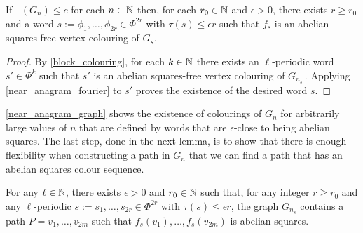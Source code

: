 \documentclass{patmorin}
\DeclareMathOperator{\afcn}{\dot{\chi}_\pi}
\begin{document}
\begin{lem}\label{near_anagram_graph}
    If $\afcn(G_n)\le c$ for each $n\in\mathbb{N}$ then, for each $r_0\in\mathbb{N}$ and $\epsilon>0$, there exists $r\ge r_0$ and a word $s:=\phi_1,\ldots,\phi_{2r}\in\Phi^{2r}$ with $\tau(s)\le\epsilon r$ such that $f_s$ is an abelian squares-free vertex colouring of $G_{s}$.
\end{lem}

\begin{proof}
    By \cref{block_colouring}, for each $k\in\mathbb{N}$ there exists an $\ell$-periodic word $s'\in\Phi^{k}$ such that $s'$ is an abelian squares-free vertex colouring of $G_{n_{s'}}$. Applying \cref{near_anagram_fourier} to $s'$ proves the existence of the desired word $s$.
\end{proof}

\cref{near_anagram_graph} shows the existence of colourings of $G_n$ for arbitrarily large values of $n$ that are defined by words that are $\epsilon$-close to being abelian squares.  The last step, done in the next lemma, is to show that there is enough flexibility when constructing a path in $G_n$ that we can find a path that has an abelian squares colour sequence.

\begin{lem}\label{anagramish_path}
    For any $\ell\in\mathbb{N}$, there exists $\epsilon>0$ and $r_0\in\mathbb{N}$ such that, for any integer $r\ge r_0$ and any $\ell$-periodic $s:=s_1,\ldots,s_{2r}\in\Phi^{2r}$ with $\tau(s)\le\epsilon r$, the graph $G_{n_s}$ contains a path $P=v_1,\ldots,v_{2m}$ such that $f_s(v_1),\ldots,f_s(v_{2m})$ is abelian squares.
\end{lem}
\end{document}
